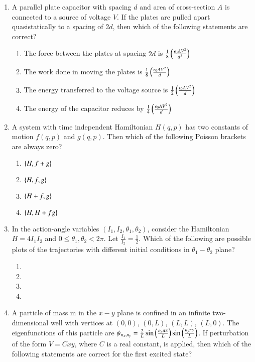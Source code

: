 \documentclass[journal]{IEEEtran}
\begin{document}
\begin{enumerate}

\item A parallel plate capacitor with spacing $d$ and area of cross-section $A$ is connected to a source of voltage $V$. If the plates are pulled apart quasistatically to a spacing
of 2$d$, then which of the following statements are correct? 

\begin{enumerate}
\item The force between the plates at spacing $2d$ is $\frac{1}{8}\left(\frac{\epsilon_0AV^2}{d^2}\right)$
\item The work done in moving the plates is $\frac{1}{8}\left(\frac{\epsilon_0AV^2}{d}\right)$
\item The energy transferred to the voltage source is $\frac{1}{2}\left(\frac{\epsilon_0AV^2}{d}\right)$
\item The energy of the capacitor reduces by $\frac{1}{4}\left(\frac{\epsilon_0AV^2}{d}\right)$
\end{enumerate}

\item A system with time independent Hamiltonian $H(q,p)$ has two constants of motion $f(q,p)$ and $g(q,p)$. Then which of the following Poisson brackets are always zero?

\begin{enumerate}
\item $\left\{H,f+g\right\}$
\item $\left\{H,{f,g}\right\}$
\item $\left\{H+f,g\right\}$
\item $\left\{H,H+fg\right\}$
\end{enumerate}

\item In the action-angle variables $(I_1,I_2,\theta_1,\theta_2)$, consider the Hamiltonian $H=4I_1I_2$ and $0\leq\theta_1,\theta_2<2\pi$. Let $\frac{I_1}{I_2}=\frac{1}{2}$. Which of the following are possible plots of the trajectories with different initial conditions in $\theta_1-\theta_2$ plane?

\begin{enumerate}
\item 
\item 
\item 
\item 
\end{enumerate}

\item A particle of mass m in the $x-y$ plane is confined in an infinite two-dimensional well with vertices at $(0,0)$, $(0,L)$, $(L,L)$, $(L,0)$. The eigenfunctions of this particle are $\psi_{n_x,n_y} = \frac{2}{L}\sin{\ensuremath{\left(\frac{n_x\pi x}{L}\right)}}\sin{\ensuremath{\left(\frac{n_y\pi y}{L}\right)}}$. If perturbation of the form $V=Cxy$, where $C$ is a real constant, is applied, then which of the following statements are correct for the first excited state?


\end{enumerate}
\end{document}
